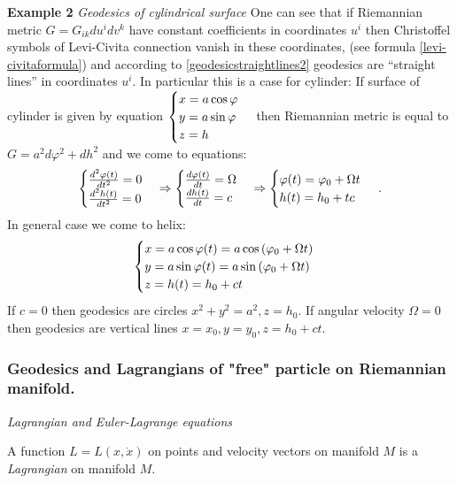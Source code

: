 \documentclass[12pt]{article}
\theoremstyle{theorem}
\numberwithin{equation}{section}
\begin{document}
{{\bf Example 2}  {\it Geodesics of  cylindrical surface}
One can see that if Riemannian metric $G=G_{ik}du^idv^k$ have constant coefficients
  in  coordinates $u^i$ then Christoffel symbols of Levi-Civita connection vanish in these coordinates,
  (see formula \eqref{levi-civitaformula}) and according to \eqref{geodesicstraightlines2}
   geodesics are  ``straight lines'' in coordinates $u^i$. In particular this is a case for cylinder:
  If surface of cylinder is given by equation
  $\begin{cases} x=a\cos\varphi\cr y=a\sin\varphi \cr z=h\cr
  \end{cases}$
  then Riemannian metric is equal to $G=a^2d\varphi^2+dh^2$ and we come to equations:
    \begin{equation}\label{geodesicstraightlines4}
    \begin {cases}
    {d^2 \varphi(t)\over dt^2}=0 \cr
    {d^2 h(t)\over dt^2}=0 \cr
    \end{cases}\Rightarrow
         \begin {cases}
    {d \varphi(t)\over dt}=\Omega \cr
    {d h(t)\over dt}=c \cr
    \end{cases} \Rightarrow
     \begin {cases}
    \varphi(t)=\varphi_0+\Omega t\cr
    h(t)=h_0+tc \cr
    \end{cases}\,.
       \end{equation}
    In general case we come to helix:
     \begin{equation}\label{geodesicofcylinder2}
      \begin{cases} x=a\cos\varphi (t)=a\cos \left(\varphi_0+\Omega t\right)\cr
       y=a\sin\varphi(t)=a\sin \left(\varphi_0+\Omega t\right) \cr z=h(t)=h_0+ct\cr
  \end{cases}
  \end{equation}
  If $c=0$ then geodesics are circles $x^2+y^2=a^2, z=h_0$. If angular velocity $\Omega=0$
  then geodesics are vertical lines $x=x_0, y=y_0, z=h_0+ct$.



   \subsubsection {Geodesics and Lagrangians of "free" particle on Riemannian manifold.}


     \centerline {\it Lagrangian and Euler-Lagrange equations}

   A function $L=L(x,\dot x)$ on points and velocity vectors on manifold $M$
   is a {\it Lagrangian} on manifold $M$.


}
\end{document}
